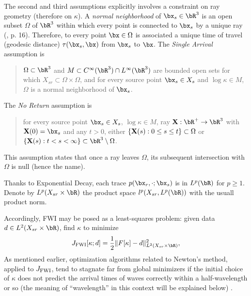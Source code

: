 The second and third assumptions explicitly involves a constraint on ray geometry
(therefore on $\kappa$). A {\em normal neighborhood} of
$\bx_s \in \bR^3$ is an open subset $\Omega$ of $\bR^3$ 
within which every point is connected to $\bx_s$ by  a unique ray  (\cite{Friedlander:75},
p. 16). Therefore, to every point $\bx \in \Omega$ is associated a
unique time of travel (geodesic distance) $\tau(\bx_s,\bx)$ from $\bx_s$ to $\bx$.
The {\em Single Arrival} assumption is
\begin{quote}
  $\Omega\subset \bR^3$ and $M \subset C^{\infty}(\bR^3) \cap
  L^{\infty}(\bR^3)$ are bounded open sets for which $X_{sr} \subset
  \Omega \times \Omega$, and for every source point $\bx_s\in X_{s}$
  and $\log \kappa \in M$, $\Omega$ is a normal neighborhood of
  $\bx_s$.
\end{quote}

The {\em No Return} assumption is
\begin{quote}
  for every source point $\bx_s \in X_{s}$, $\log \kappa \in M$, ray ${\bf X}:\bR^+\rightarrow \bR^3$
  with ${\bf X}(0)=\bx_s$ and any $t>0$, either $\{{\bf X}(s): 0\le s \le t\} \subset \Omega$
  or $\{{\bf X}(s): t < s < \infty\} \subset \bR^3 \setminus \Omega$.
\end{quote}
This assumption states that once a ray leaves
$\Omega$, its subsequent intersection with $\Omega$ is null (hence the name).

Thanks to Exponential Decay, each trace $p(\bx_r,\cdot;\bx_s)$ is in $L^{p}(\bR)$ for $p
\ge 1$.
Denote by $L^p(X_{sr} \times \bR)$ the product space $l^p(X_{sr},L^p(\bR))$
with the usuall product norm. 

Accordingly, FWI may be posed as a least-squares
problem: given data $d \in
L^2(X_{sr}\times \bR)$, find $\kappa$ to minimize
\begin{equation}
  \label{eqn:fwi}
  J_{\rm FWI}[\kappa;d]= \frac{1}{2}\|F[\kappa]-d\|^2_{L^2(X_{sr} \times \bR)},
\end{equation}
As mentioned earlier, optimization algorithms related to Newton's method, applied to
$J_{\rm FWI}$, tend to stagnate far from global minimizers if
the initial choice of $\kappa$ does not predict the arrival times of
waves correctly within a half-wavelength or so (the meaning of
``wavelength'' in this context will be explained below)
\cite[]{GauTarVir:86,VirieuxOperto:09}.

